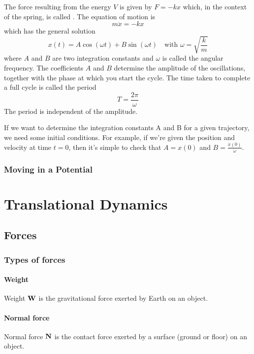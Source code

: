 The force resulting from the energy $V$ is given by $F=-kx$ which, in the context of the spring, is called . The equation of motion is
\begin{equation}
m\ddot{x} = -kx
\end{equation}
which has the general solution
\[ x(t) = A \cos(\omega t) + B \sin(\omega t) \quad \text{with }\omega=\sqrt{\frac{k}{m}} \]
where $A$ and $B$ are two integration constants and $\omega$ is called the angular frequency. The coefficients $A$ and $B$ determine the amplitude of the oscillations, together with the phase at which you start the cycle. The time taken to complete a full cycle is called the period
\begin{equation}
T = \frac{2\pi}{\omega}
\end{equation}
The period is independent of the amplitude.

If we want to determine the integration constants A and B for a given trajectory, we need some initial conditions. For example, if we're given the position and velocity at time $t=0$, then it's simple to check that $A=x(0)$ and $B=\frac{\dot{x}(0)}{\omega}$.

\subsection{Moving in a Potential}


\chapter{Translational Dynamics}
\section{Forces}
\subsection{Types of forces}
\subsubsection{Weight}
Weight $\vb{W}$ is the gravitational force exerted by Earth on an object.

\subsubsection{Normal force}
Normal force $\vb{N}$ is the contact force exerted by a surface (ground or floor) on an object.

